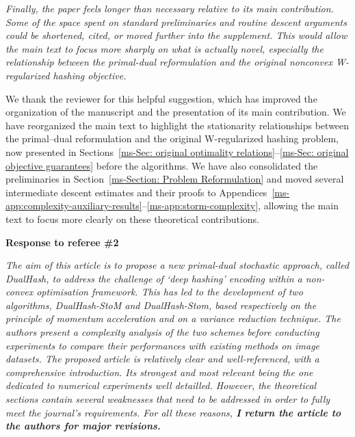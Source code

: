 \documentclass[11pt]{article}
\newcommand{\mref}[1]{\ref*{ms-#1}}
\newenvironment{qalist}{\begin{description}[leftmargin=0pt,labelindent=0pt,itemsep=0.8em,parsep=0.5em,font=\normalfont\upshape\bfseries]}{\end{description}}
\begin{document}
\begin{qalist}
\item[{Q3.}] {\itshape Finally, the paper feels longer than necessary relative to its main contribution. Some of the space spent on standard preliminaries and routine descent arguments could be shortened, cited, or moved further into the supplement. This would allow the main text to focus more sharply on what is actually novel, especially the relationship between the primal-dual reformulation and the original nonconvex W-regularized hashing objective.}
\item[Response:] We thank the reviewer for this helpful suggestion, which has improved the organization of the manuscript and the presentation of its main contribution. We have reorganized the main text to highlight the stationarity relationships between the primal--dual reformulation and the original W-regularized hashing problem, now presented in Sections~\mref{Sec: original optimality relations}--\mref{Sec: original objective guarantees} before the algorithms. We have also consolidated the preliminaries in Section~\mref{Section: Problem Reformulation} and moved several intermediate descent estimates and their proofs to Appendices~\mref{app:complexity-auxiliary-results}--\mref{app:storm-complexity}, allowing the main text to focus more clearly on these theoretical contributions.
\end{qalist}

\clearpage
\begin{center}
{\Large\bfseries Response to referee \#2\par}
\end{center}

\medskip
{\itshape The aim of this article is to propose a new primal-dual stochastic approach, called DualHash, to address the challenge of `deep hashing' encoding within a non-convex optimisation framework. This has led to the development of two algorithms, DualHash-StoM and DualHash-Stom, based respectively on the principle of momentum acceleration and on a variance reduction technique. The authors present a complexity analysis of the two schemes before conducting experiments to compare their performances with existing methods on image datasets. The proposed article is relatively clear and well-referenced, with a comprehensive introduction. Its strongest and most relevant being the one dedicated to numerical experiments well detailled. However, the theoretical sections contain several weaknesses that need to be addressed in order to fully meet the journal's requirements. For all these reasons, \textbf{I return the article to the authors for major revisions.}}
\end{document}
